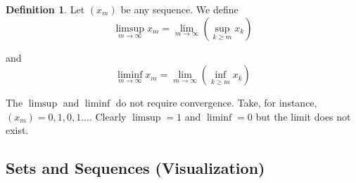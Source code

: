 \documentclass{article}
\theoremstyle{definition}
\newtheorem{definition}{Definition}
\begin{document}
\begin{definition}
  Let $(x_m)$ be any sequence. We define
  \[
    \limsup_{m \to \infty} x_m = \lim_{m \to \infty} \left(\sup_{k \ge m} x_k\right)
  \]

  and
  \[
    \liminf_{m \to \infty} x_m = \lim_{m \to \infty} \left(\inf_{k \ge m} x_k\right)
  \]
\end{definition}

The $\limsup$ and $\liminf$ do not require convergence. Take, for instance, $(x_m) = 0, 1, 0, 1 \ldots$. Clearly $\limsup = 1$ and $\liminf = 0$ but the limit does not exist.

\subsection{Sets and Sequences (Visualization)}
\label{ssub:sets_and_sequences_visualization_}
\end{document}
